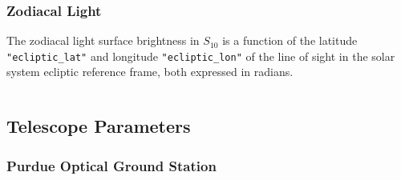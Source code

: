\begin{listing}[H]
\inputminted[breaklines=true, breakanywhere=true, breaksymbol=\hspace{0pt}, fontsize=\footnotesize]{json}{/Users/liamrobinson/Documents/PyLightCurves/mirage/resources/data/moonlight.json}
\end{listing}

\subsubsection{Zodiacal Light} \label{data:roach_zod}

The zodiacal light surface brightness in $S_10$ is a function of the latitude \texttt{"ecliptic\_lat"} and longitude \texttt{"ecliptic\_lon"} of the line of sight in the solar system ecliptic reference frame, both expressed in radians.

\begin{listing}[H]
\inputminted[breaklines=true, breakanywhere=true, breaksymbol=\hspace{0pt}, fontsize=\footnotesize]{json}{/Users/liamrobinson/Documents/PyLightCurves/mirage/resources/data/zodiacal.json}
\end{listing}

\subsection{Telescope Parameters}

\subsubsection{Purdue Optical Ground Station}

